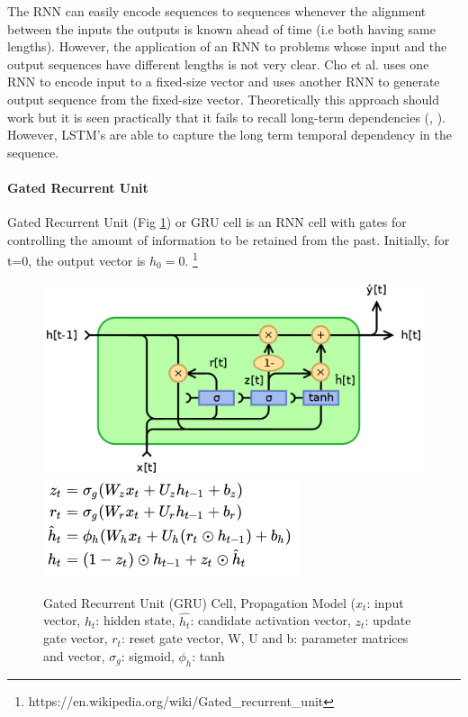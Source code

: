 The RNN can easily encode sequences to sequences whenever the alignment between the inputs the outputs is known ahead of time (i.e both having same lengths). However, the application of an RNN to problems whose input and the output sequences have different lengths is not very clear. Cho et al. \cite{cho2014learning} uses one RNN to encode input to a fixed-size vector and uses another RNN to generate output sequence from the fixed-size vector. Theoretically this approach should work but it is seen practically that it fails to recall long-term dependencies (\cite{bengio1994learning}, \cite{hochreiter2001gradient}). However, LSTM's \cite{hochreiter1997long} are able to capture the long term temporal dependency in the sequence.

\paragraph{Gated Recurrent Unit}
Gated Recurrent Unit (Fig \ref{fig:gru}) or GRU cell is an RNN cell with gates for controlling the amount of information to be retained from the past. Initially, for t=0, the output vector is $h_{0}=0$. \footnote{https://en.wikipedia.org/wiki/Gated\_recurrent\_unit}

\begin{figure}
    \centering
    \includegraphics[scale=0.2]{gru.png}
    \includegraphics[scale=0.4]{grueqn.png}
    \caption{Gated Recurrent Unit (GRU) Cell, Propagation Model ($x_t$: input vector, $h_t$: hidden state, $\hat{h_t}$: candidate activation vector, $z_t$: update gate vector, $r_t$: reset gate vector, W, U and b: parameter matrices and vector, $\sigma_g$: sigmoid, $\phi_h$: tanh}
    \label{fig:gru}
\end{figure}

